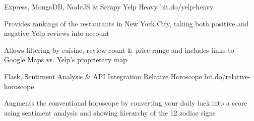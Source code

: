 

\begin{cventries}

 \cventry
    {Express, MongoDB, NodeJS \& Scrapy} %
    {Yelp Heavy} %
    {bit.do/yelp-heavy} %
    {} %
    {
      \begin{cvitems} %
        \item {Provides rankings of the restaurants in New York City, taking both positive and negative Yelp reviews into account}
        \item {Allows filtering by cuisine, review count \& price range and includes links to Google Maps vs. Yelp's proprietary map}
      \end{cvitems}
    }

 \cventry
    {Flask, Sentiment Analysis \& API Integration} %
    {Relative Horoscope} %
    {bit.do/relative-horoscope} %
    {} %
    {
      \begin{cvitems} %
        \item {Augments the conventional horoscope by converting your daily luck into a score using sentiment analysis and showing hierarchy of the 12 zodiac signs}
      \end{cvitems}
    }

\end{cventries}